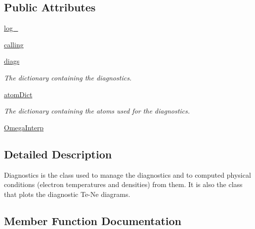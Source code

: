 \subsection*{Public Attributes}
\begin{DoxyCompactItemize}
\item 
\hyperlink{classpyneb_1_1core_1_1diags_1_1_diagnostics_afd87151907f32bc0dc45f0171b61374e}{log\+\_\+}
\item 
\hyperlink{classpyneb_1_1core_1_1diags_1_1_diagnostics_ab25fa7ebe84b603684dee62410c1e34c}{calling}
\item 
\hyperlink{classpyneb_1_1core_1_1diags_1_1_diagnostics_af600b32fdefbb2e4ed370e8dd91bfc7b}{diags}
\begin{DoxyCompactList}\small\item\em The dictionary containing the diagnostics. \end{DoxyCompactList}\item 
\hyperlink{classpyneb_1_1core_1_1diags_1_1_diagnostics_a468cb618d893dc9d4d5d4bc1d96b0ee4}{atom\+Dict}
\begin{DoxyCompactList}\small\item\em The dictionary containing the atoms used for the diagnostics. \end{DoxyCompactList}\item 
\hyperlink{classpyneb_1_1core_1_1diags_1_1_diagnostics_a9fb4568356c398593832b0d4f2eb18d9}{Omega\+Interp}
\end{DoxyCompactItemize}


\subsection{Detailed Description}
\begin{DoxyVerb}Diagnostics is the class used to manage the diagnostics and to computed physical conditions 
    (electron temperatures and densities) from them. 
It is also the class that plots the diagnostic Te-Ne diagrams.\end{DoxyVerb}
 

\subsection{Member Function Documentation}
\hypertarget{classpyneb_1_1core_1_1diags_1_1_diagnostics_af3ae155409bcf4807ade0aa0990420de}{}
